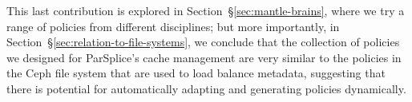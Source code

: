 
This last contribution is explored in Section~\S\ref{sec:mantle-brains}, where
we try a range of policies from different disciplines; but more importantly, in
Section~\S\ref{sec:relation-to-file-systems}, we conclude that the collection
of policies we designed for ParSplice's cache management are very similar to
the policies in the Ceph file system that are used to load balance metadata,
suggesting that there is potential for automatically adapting and generating
policies dynamically. 


